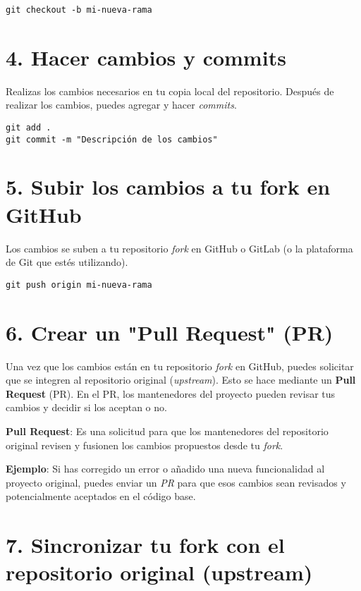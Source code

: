 \documentclass{article}
\begin{document}
\begin{verbatim}
git checkout -b mi-nueva-rama
\end{verbatim}

\section{4. Hacer cambios y commits}

Realizas los cambios necesarios en tu copia local del repositorio. Después de realizar los cambios, puedes agregar y hacer \textit{commits}.

\begin{verbatim}
git add .
git commit -m "Descripción de los cambios"
\end{verbatim}

\section{5. Subir los cambios a tu fork en GitHub}

Los cambios se suben a tu repositorio \textit{fork} en GitHub o GitLab (o la plataforma de Git que estés utilizando).

\begin{verbatim}
git push origin mi-nueva-rama
\end{verbatim}

\section{6. Crear un "Pull Request" (PR)}

Una vez que los cambios están en tu repositorio \textit{fork} en GitHub, puedes solicitar que se integren al repositorio original (\textit{upstream}). Esto se hace mediante un \textbf{Pull Request} (PR). En el PR, los mantenedores del proyecto pueden revisar tus cambios y decidir si los aceptan o no.

\noindent
\textbf{Pull Request}: Es una solicitud para que los mantenedores del repositorio original revisen y fusionen los cambios propuestos desde tu \textit{fork}.

\noindent
\textbf{Ejemplo}: Si has corregido un error o añadido una nueva funcionalidad al proyecto original, puedes enviar un \textit{PR} para que esos cambios sean revisados y potencialmente aceptados en el código base.

\section{7. Sincronizar tu fork con el repositorio original (upstream)}
\end{document}

